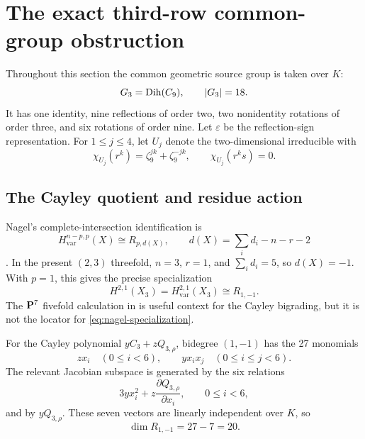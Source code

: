 \section{The exact third-row common-group obstruction}
\label{sec:n3-character}

Throughout this section the common geometric source group is taken over
\(K\):
\[
G_3=\operatorname{Dih}(C_9),\qquad |G_3|=18.
\]
It has one identity, nine reflections of order two, two nonidentity
rotations of order three, and six rotations of order nine.  Let
\(\varepsilon\) be the reflection-sign representation.  For
\(1\le j\le4\), let \(U_j\) denote the two-dimensional irreducible with
\begin{equation}
\chi_{U_j}(r^k)=\zeta_9^{jk}+\zeta_9^{-jk},\qquad
\chi_{U_j}(r^ks)=0.
\label{eq:dihedral-irreducibles}
\end{equation}

\subsection{The Cayley quotient and residue action}

Nagel's complete-intersection identification is
\[
H_{\mathrm{var}}^{n-p,p}(X)\cong R_{p,d(X)},\qquad
d(X)=\sum_i d_i-n-r-2
\]
\cite[Proposition 2.16]{Nagel1997}.  In the present \((2,3)\)
threefold, \(n=3\), \(r=1\), and \(\sum_i d_i=5\), so
\(d(X)=-1\).  With \(p=1\), this gives the precise specialization
\begin{equation}
H^{2,1}(X_3)=H_{\mathrm{var}}^{2,1}(X_3)
\cong R_{1,-1}.
\label{eq:nagel-specialization}
\end{equation}
The \(\mathbf P^7\) fivefold calculation in
\cite[\S5.4]{FaveroIlievKatzarkov2014} is useful context for the
Cayley bigrading, but it is not the locator for
\eqref{eq:nagel-specialization}.

For the Cayley polynomial \(yC_3+zQ_{3,\rho}\), bidegree
\((1,-1)\) has the 27 monomials
\[
zx_i\quad(0\le i<6),\qquad
yx_ix_j\quad(0\le i\le j<6).
\]
The relevant Jacobian subspace is generated by the six relations
\begin{equation}
3yx_i^2+z\frac{\partial Q_{3,\rho}}{\partial x_i},
\qquad 0\le i<6,
\label{eq:cayley-derivatives}
\end{equation}
and by \(yQ_{3,\rho}\).  These seven vectors are linearly independent over
\(K\), so
\begin{equation}
\dim R_{1,-1}=27-7=20.
\label{eq:cayley-dimension}
\end{equation}


